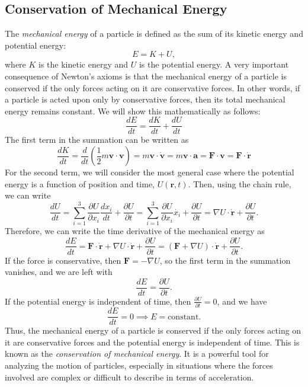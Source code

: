 \documentclass[12pt]{article}
\begin{document}
\subsection{Conservation of Mechanical Energy}
The \emph{mechanical energy} of a particle is defined as the sum of its kinetic energy and potential energy:
\begin{equation}
    E = K + U,
\end{equation}
where $K$ is the kinetic energy and $U$ is the potential energy. A very important consequence of Newton's axioms is that the mechanical energy of a particle is conserved if the only forces acting on it are conservative forces. In other words, if a particle is acted upon only by conservative forces, then its total mechanical energy remains constant. We will show this mathematically as follows:
\begin{equation}
    \frac{dE}{dt} = \frac{dK}{dt} + \frac{dU}{dt} 
\end{equation}
The first term in the summation can be written as
\begin{equation}
\frac{dK}{dt} = \frac{d}{dt}\left(\frac{1}{2}m\mathbf{v}\cdot\mathbf{v}\right) = m \mathbf{v}\cdot\dot{\mathbf{v}} = m \mathbf{v}\cdot\mathbf{a} = \mathbf{F}\cdot\mathbf{v} = \mathbf{F}\cdot\dot{\mathbf{r}}
\end{equation}
For the second term, we will consider the most general case where the potential energy is a function of position and time, $U(\mathbf{r},t)$. Then, using the chain rule, we can write
\begin{equation}
\frac{dU}{dt} = \sum_{i=1}^{3} \frac{\partial U}{\partial x_i}\frac{dx_i}{dt} + \frac{\partial U}{\partial t} = \sum_{i=1}^{3} \frac{\partial U}{\partial x_i}\dot{x_i} + \frac{\partial U}{\partial t} = \nabla U\cdot\dot{\mathbf{r}} + \frac{\partial U}{\partial t}.
\end{equation}
Therefore, we can write the time derivative of the mechanical energy as
\begin{equation}
\frac{dE}{dt} = \mathbf{F}\cdot\dot{\mathbf{r}} + \nabla U\cdot\dot{\mathbf{r}} + \frac{\partial U}{\partial t} = (\mathbf{F} + \nabla U)\cdot\dot{\mathbf{r}} + \frac{\partial U}{\partial t}.
\end{equation}
If the force is conservative, then $\mathbf{F} = -\nabla U$, so the first term in the summation vanishes, and we are left with
\begin{equation}
\frac{dE}{dt} = \frac{\partial U}{\partial t}.
\end{equation}
If the potential energy is independent of time, then $\frac{\partial U}{\partial t} = 0$, and we have
\begin{equation}
\frac{dE}{dt} = 0 \implies E = \text{constant}.
\end{equation}
Thus, the mechanical energy of a particle is conserved if the only forces acting on it are conservative forces and the potential energy is independent of time. This is known as the \emph{conservation of mechanical energy}. It is a powerful tool for analyzing the motion of particles, especially in situations where the forces involved are complex or difficult to describe in terms of acceleration.
\end{document}
